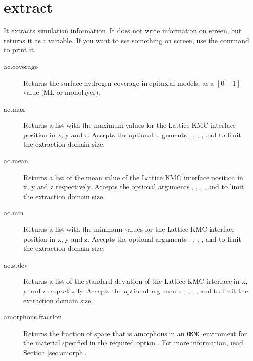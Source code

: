 \section{extract}
\label{sec:extract}

It extracts simulation information. It does not write information on screen, but returns it as a variable. If you want to see something on screen, use the  command to print it.

\begin{description}

\item [ac.coverage] Returns the surface hydrogen coverage in epitaxial models, as a $[0-1]$ value (ML or monolayer).

\item [ac.max] Returns a list with the maximum values for the Lattice KMC interface position in x, y and z. Accepts the optional arguments  , , , ,   and  to limit the extraction domain size. 

\item [ac.mean] Returns a list of the mean value of the Lattice KMC interface position in x, y and z respectively. Accepts the optional arguments  , , , ,   and  to limit the extraction domain size. 

\item [ac.min] Returns a list with the minimum values for the Lattice KMC interface position in x, y and z. Accepts the optional arguments  , , , ,   and  to limit the extraction domain size. 

\item [ac.stdev] Returns a list of the standard deviation of the Lattice KMC interface in x, y and z respectively. Accepts the optional arguments  , , , ,   and  to limit the extraction domain size. 

\item [amorphous.fraction] Returns the fraction of space that is amorphous in an {\tt OKMC} enviroment for the material specified in the required option . For more information, read Section \ref{sec:amorph}.


\end{description}
